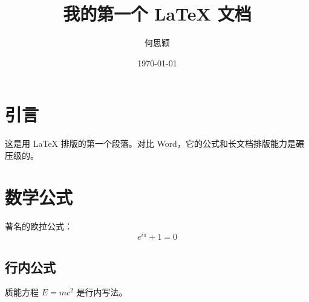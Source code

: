 \documentclass[12pt]{article}   %
\title{我的第一个 \LaTeX{} 文档}
\author{何思颖}
\date{\today}
\begin{document}
\maketitle

\section{引言}
这是用 \LaTeX{} 排版的第一个段落。对比 Word，它的公式和长文档排版能力是碾压级的。

\section{数学公式}
著名的欧拉公式：
\begin{equation}
    e^{i\pi} + 1 = 0
\end{equation}

\subsection{行内公式}
质能方程 $E = mc^2$ 是行内写法。
\end{document}
